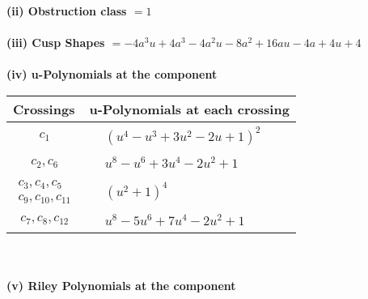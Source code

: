 \documentclass[1p]{elsarticle_modified}
\theoremstyle{definition}
\begin{document}
\flushleft \textbf{(ii) Obstruction class $= 1$}\\~\\
\flushleft \textbf{(iii) Cusp Shapes $= -4 a^3 u+4 a^3-4 a^2 u-8 a^2+16 a u-4 a+4 u+4$}\\~\\
\newpage\renewcommand{\arraystretch}{1}
\flushleft \textbf{(iv) u-Polynomials at the component}\newline \\
\begin{tabular}{m{50pt}|m{274pt}}
Crossings & \hspace{64pt}u-Polynomials at each crossing \\
\hline $$\begin{aligned}c_{1}\end{aligned}$$&$\begin{aligned}
&(u^4- u^3+3 u^2-2 u+1)^2
\end{aligned}$\\
\hline $$\begin{aligned}c_{2},c_{6}\end{aligned}$$&$\begin{aligned}
&u^8- u^6+3 u^4-2 u^2+1
\end{aligned}$\\
\hline $$\begin{aligned}c_{3},c_{4},c_{5}\\c_{9},c_{10},c_{11}\end{aligned}$$&$\begin{aligned}
&(u^2+1)^4
\end{aligned}$\\
\hline $$\begin{aligned}c_{7},c_{8},c_{12}\end{aligned}$$&$\begin{aligned}
&u^8-5 u^6+7 u^4-2 u^2+1
\end{aligned}$\\
\hline
\end{tabular}\\~\\
\newpage\renewcommand{\arraystretch}{1}
\flushleft \textbf{(v) Riley Polynomials at the component}\newline \\
\end{document}
